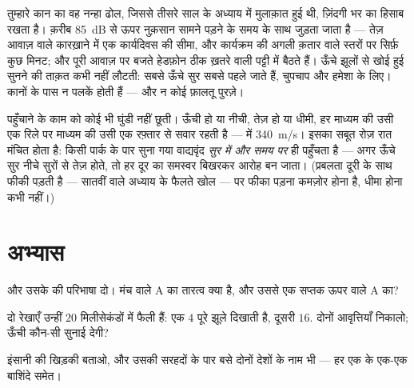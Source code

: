 \begin{remark}[कान का बजट]\label{rem:g8:sound-pitch-loudness:earsafety}
तुम्हारे कान का वह नन्हा ढोल, जिससे तीसरे साल के अध्याय में मुलाक़ात
हुई थी, ज़िंदगी भर का हिसाब रखता है। क़रीब \qty{85}{dB} से ऊपर नुक़सान
सामने पड़ने के समय के साथ जुड़ता जाता है --- तेज़ आवाज़ वाले कारख़ाने
में एक कार्यदिवस की सीमा, और कार्यक्रम की अगली क़तार वाले स्तरों पर
सिर्फ़ कुछ मिनट; और पूरी आवाज़ पर बजते हेडफ़ोन ठीक ख़तरे वाली पट्टी
में बैठते हैं। ऊँचे झूलों से खोई हुई सुनने की ताक़त कभी नहीं लौटती:
सबसे ऊँचे सुर सबसे पहले जाते हैं, चुपचाप और हमेशा के लिए। कानों के
पास न पलकें होती हैं --- और न कोई फ़ालतू पुरज़े।
\end{remark}

\begin{example}[चाल, जिसे कोई घुंडी नहीं छेड़ती]\label{ex:g8:sound-pitch-loudness:speed}
पहुँचाने के काम को कोई भी घुंडी नहीं छूती। ऊँची हो या नीची, तेज़ हो या
धीमी, हर  माध्यम की उसी एक रिले पर माध्यम की उसी एक रफ़्तार से
सवार रहती है ---  में \qty{340}{m/s}। इसका सबूत रोज़ रात मंचित होता
है: किसी पार्क के पार सुना गया वाद्यवृंद \emph{सुर में और समय पर} ही
पहुँचता है --- अगर ऊँचे सुर नीचे सुरों से तेज़ होते, तो हर दूर का
समस्वर बिखरकर आरोह बन जाता। (प्रबलता दूरी के साथ फीकी पड़ती है ---
सातवीं  वाले अध्याय के फैलते खोल --- पर फीका पड़ना कमज़ोर होना
है, धीमा होना कभी नहीं।)
\end{example}

\section{अभ्यास}

\begin{exercise}[$\star$]\label{exo:g8:sound-pitch-loudness:1}
 और उसके  की परिभाषा दो। मंच वाले A का तारत्व क्या
है, और उससे एक सप्तक ऊपर वाले A का?
\end{exercise}

\begin{exercise}[$\star$]\label{exo:g8:sound-pitch-loudness:2}
दो रेखाएँ उन्हीं $20$ मिलीसेकंडों में फैली हैं: एक $4$ पूरे झूले
दिखाती है, दूसरी $16$. दोनों आवृत्तियाँ निकालो; ऊँची कौन-सी सुनाई
देगी?
\end{exercise}

\begin{exercise}[$\star$]\label{exo:g8:sound-pitch-loudness:3}
इंसानी  की खिड़की बताओ, और उसकी सरहदों के पार बसे दोनों देशों के
नाम भी --- हर एक के एक-एक बाशिंदे समेत।
\end{exercise}

